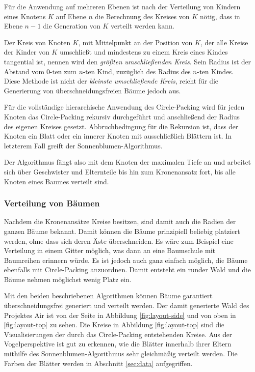 Für die Anwendung auf mehreren Ebenen ist nach der Verteilung von Kindern eines Knotens $K$ auf Ebene $n$ die Berechnung des Kreises von $K$ nötig, dass in Ebene $n - 1$ die Generation von $K$ verteilt werden kann.

Der Kreis von Knoten $K$, mit Mittelpunkt an der Position von $K$, der alle Kreise der Kinder von $K$ umschließt und mindestens zu einem Kreis eines Kindes tangential ist, nennen wird den \textit{größten umschließenden Kreis}. Sein Radius ist der Abstand vom $0$-ten zum $n$-ten Kind, zuzüglich des Radius des $n$-ten Kindes. Diese Methode ist nicht der \textit{kleinste umschließende Kreis}, reicht für die Generierung von überschneidungsfreien Bäume jedoch aus.

Für die vollständige hierarchische Anwendung des Circle-Packing wird für jeden Knoten das Circle-Packing rekursiv durchgeführt und anschließend der Radius des eigenen Kreises gesetzt. Abbruchbedingung für die Rekursion ist, dass der Knoten ein Blatt oder ein innerer Knoten mit ausschließlich Blättern ist. In letzterem Fall greift der Sonnenblumen-Algorithmus.

Der Algorithmus fängt also mit dem Knoten der maximalen Tiefe an und arbeitet sich über Geschwister und Elternteile bis hin zum Kronenansatz fort, bis alle Knoten eines Baumes verteilt sind.

\subsubsection*{Verteilung von Bäumen}


Nachdem die Kronenansätze Kreise besitzen, sind damit auch die Radien der ganzen Bäume bekannt. Damit können die Bäume prinzipiell beliebig platziert werden, ohne dass sich deren Äste überschneiden. Es wäre zum Beispiel eine Verteilung in einem Gitter möglich, was dann an eine Baumschule mit Baumreihen erinnern würde. Es ist jedoch auch ganz einfach möglich, die Bäume ebenfalls mit Circle-Packing anzuordnen. Damit entsteht ein runder Wald und die Bäume nehmen möglichst wenig Platz ein.

Mit den beiden beschriebenen Algorithmen können Bäume garantiert überschneidungsfrei generiert und verteilt werden. Der damit generierte Wald des Projektes Air ist von der Seite in Abbildung \ref{fig:layout-side} und von oben in \ref{fig:layout-top} zu sehen. Die Kreise in Abbildung \ref{fig:layout-top} sind die Visualisierungen der durch das Circle-Packing entstehenden Kreise. Aus der Vogelperspektive ist gut zu erkennen, wie die Blätter innerhalb ihrer Eltern mithilfe des Sonnenblumen-Algorithmus sehr gleichmäßig verteilt werden. Die Farben der Blätter werden in Abschnitt \ref{sec:data} aufgegriffen.

